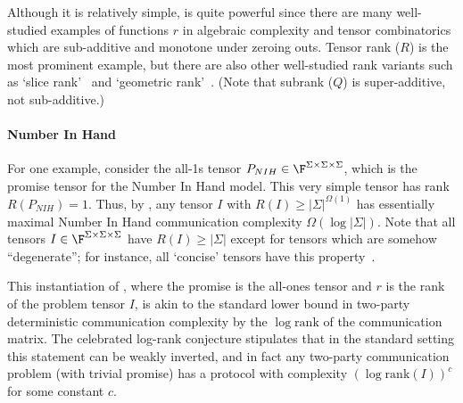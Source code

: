 
Although it is relatively simple,  is quite powerful since there are many well-studied examples of functions $r$ in algebraic complexity and tensor combinatorics which are sub-additive and monotone under zeroing outs. Tensor rank ($R$) is the most prominent example, but there are also other well-studied rank variants such as `slice rank'~\cite{T16} and `geometric rank'~\cite{KMZ20}. (Note that subrank ($Q$) is super-additive, not sub-additive.)

\paragraph{Number In Hand}
For one example, consider the all-1s tensor $P_{NIH} \in \F^{\Sigma \times \Sigma \times \Sigma}$, which is the promise tensor for the Number In Hand model. This very simple tensor has rank $R(P_{NIH}) = 1$. Thus, by , any tensor $I$ with $R(I) \geq |\Sigma|^{\Omega(1)}$ has essentially maximal Number In Hand communication complexity $\Omega(\log |\Sigma|)$. Note that all tensors $I \in \F^{\Sigma \times \Sigma \times \Sigma}$ have $R(I) \geq |\Sigma|$ except for tensors which are somehow ``degenerate''; for instance, all `concise' tensors have this property~\cite{CHLVW18}.

This instantiation of , where the promise is the all-ones tensor and $r$ is the rank of the problem tensor $I$, is akin to the standard lower bound in two-party deterministic communication complexity by the $\log \mathrm{rank}$ of the communication matrix. The celebrated log-rank conjecture stipulates that in the standard setting this statement can be weakly inverted, and in fact any two-party communication problem (with trivial promise) has a protocol with complexity $(\log \mathrm{rank}(I))^c$ for some constant $c$.

